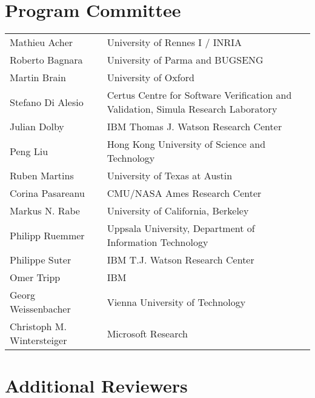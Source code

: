 \documentclass{llncs}
\begin{document}
\section*{Program Committee}
\noindent
\begin{longtable}{p{}p{}}
Mathieu Acher & University of Rennes I / INRIA\\
Roberto Bagnara & University of Parma and BUGSENG\\
Martin Brain & University of Oxford\\
Stefano Di Alesio & Certus Centre for Software Verification and Validation, Simula Research Laboratory\\
Julian Dolby & IBM Thomas J. Watson Research Center\\
Peng Liu & Hong Kong University of Science and Technology\\
Ruben Martins & University of Texas at Austin\\
Corina Pasareanu & CMU/NASA Ames Research Center\\
Markus N. Rabe & University of California, Berkeley\\
Philipp Ruemmer & Uppsala University, Department of Information Technology\\
Philippe Suter & IBM T.J. Watson Research Center\\
Omer Tripp & IBM\\
Georg Weissenbacher & Vienna University of Technology\\
Christoph M. Wintersteiger & Microsoft Research\\
\end{longtable}

\clearpage


\section*{Additional Reviewers}
\begin{longtable}{l}
\end{longtable}
\end{document}
